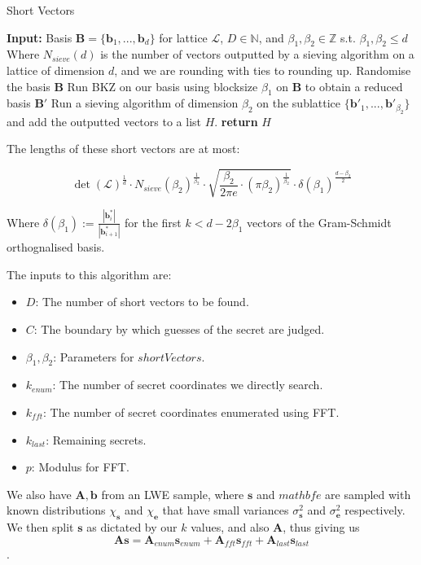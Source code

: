 \documentclass[a4paper, 10pt]{article}
\theoremstyle{definition}
\begin{document}
\begin{algorithm}[H]
    \caption{Short Vectors \cite{matzov_2022_6412487}}
    \begin{algorithmic}[1]
    \State \textbf{Input:} Basis $\mathbf{B} = \{\mathbf{b}_1,...,\mathbf{b}_d\}$ for lattice $\mathcal{L}$, $D\in \mathbb{N}$, and $\beta _1, \beta _2 \in \mathbb{Z}$ s.t. $\beta _1, \beta _2 \leq d$
     \Comment Where $N_{sieve}(d)$ is the number of vectors outputted by a sieving algorithm on a lattice of dimension $d$, and we are rounding with ties to rounding up.
        \State Randomise the basis $\mathbf{B}$
        \State Run \ac{BKZ} on our basis using blocksize $\beta_1$ on $\mathbf{B}$ to obtain a reduced basis $\mathbf{B}'$
        \State Run a sieving algorithm of dimension $\beta_2$ on the sublattice $\{\mathbf{b}'_1,...,\mathbf{b}'_{\beta_2}\}$ and add the outputted vectors to a list $H$.
    \EndFor
    \State \textbf{return} $H$
    \end{algorithmic}
\end{algorithm}

The lengths of these short vectors are at most:

\[\det (\mathcal{L})^{\frac{1}{d}}\cdot N_{sieve}(\beta _2)^{\frac{1}{\beta _2}}\cdot \sqrt{\frac{\beta_2}{2\pi e}\cdot(\pi \beta _2)^{\frac{1}{\beta _2}}}\cdot\delta(\beta_1)^{\frac{d-\beta_2}{2}}\]

Where $\delta(\beta_1) := \frac{|\mathbf{b}^*_i|}{|\mathbf{b}^*_{i+1}|}$ for the first $k<d-2\beta_1$ vectors of the Gram-Schmidt orthognalised basis.

The inputs to this algorithm are:
\begin{itemize}
    \item $D$: The number of short vectors to be found.
    \item $C$: The boundary by which guesses of the secret are judged.
    \item $\beta _1, \beta _2$: Parameters for $shortVectors$.
    \item $k_{enum}$: The number of secret coordinates we directly search.
    \item $k_{fft}$: The number of secret coordinates enumerated using \ac{FFT}.
    \item $k_{last}$: Remaining secrets.
    \item $p$: Modulus for FFT.
\end{itemize}

We also have $\mathbf{A, b}$ from an \ac{LWE} sample, where $\mathbf{s}$ and $mathbf{e}$ are sampled with known distributions $\chi _\mathbf{s}$ and $\chi _\mathbf{e}$ that have small variances $\sigma ^2_\mathbf{s}$ and $\sigma ^2_\mathbf{e}$ respectively. We then split $\mathbf{s}$ as dictated by our $k$ values, and also $\mathbf{A}$, thus giving us 
\[\mathbf{As} = \mathbf{A}_{enum}\mathbf{s}_{enum} + \mathbf{A}_{fft}\mathbf{s}_{fft} + \mathbf{A}_{last}\mathbf{s}_{last}\].
\end{document}
